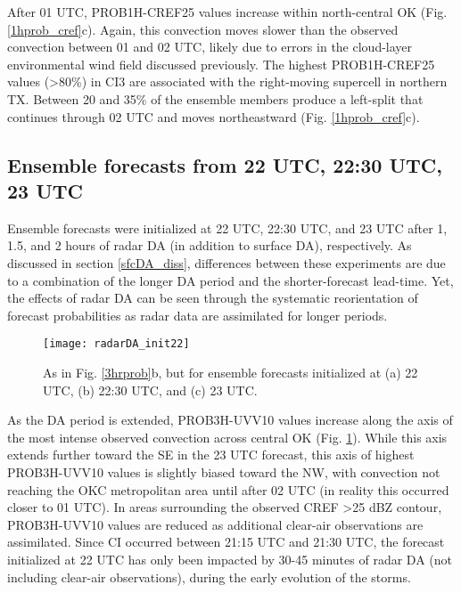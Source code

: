 After 01 UTC, PROB1H-CREF25 values increase within north-central OK (Fig. \ref{1hprob_cref}c). Again, this convection moves slower than the observed convection between 01 and 02 UTC, likely due to errors in the cloud-layer environmental wind field discussed previously. The highest PROB1H-CREF25 values (\textgreater 80\%) in CI3 are associated with the right-moving supercell in northern TX. Between 20 and 35\% of the ensemble members produce a left-split that continues through 02 UTC and moves northeastward (Fig. \ref{1hprob_cref}c).

\subsection{Ensemble forecasts from 22 UTC, 22:30 UTC, 23 UTC}
\label{inittime_section}
Ensemble forecasts were initialized at 22 UTC, 22:30 UTC, and 23 UTC after 1, 1.5, and 2 hours of radar DA (in addition to surface DA), respectively. As discussed in section \ref{sfcDA_diss}, differences between these experiments are due to a combination of the longer DA period and the shorter-forecast lead-time. Yet, the effects of radar DA can be seen through the systematic reorientation of forecast probabilities as radar data are assimilated for longer periods.

\begin{figure}
\centering
\texttt{[image: radarDA\_init22]}
\caption{As in Fig. \ref{3hrprob}b, but for ensemble forecasts initialized at (a) 22 UTC, (b) 22:30 UTC, and (c) 23 UTC.}
\label{init22}
\end{figure}

As the DA period is extended, PROB3H-UVV10 values increase along the axis of the most intense observed convection across central OK (Fig. \ref{init22}). While this axis extends further toward the SE in the 23 UTC forecast, this axis of highest PROB3H-UVV10 values is slightly biased toward the NW, with convection not reaching the OKC metropolitan area until after 02 UTC (in reality this occurred closer to 01 UTC). In areas surrounding the observed CREF \textgreater 25 dBZ contour, PROB3H-UVV10 values are reduced as additional clear-air observations are assimilated. Since CI occurred between 21:15 UTC and 21:30 UTC, the forecast initialized at 22 UTC has only been impacted by 30-45 minutes of radar DA (not including clear-air observations), during the early evolution of the storms.


